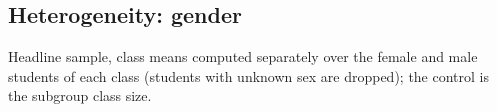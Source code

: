 \documentclass[
]{article}
\begin{document}
\begin{table}[htbp]
   \caption{Regression Results: Relaxed Sample}\label{tab: robustness relaxed sample}
   \centerline{}
\end{table}

\hypertarget{heterogeneity-gender}{%
\subsection{Heterogeneity: gender}\label{heterogeneity-gender}}

Headline sample, class means computed separately over the female and
male students of each class (students with unknown sex are dropped); the
control is the subgroup class size.
\end{document}
